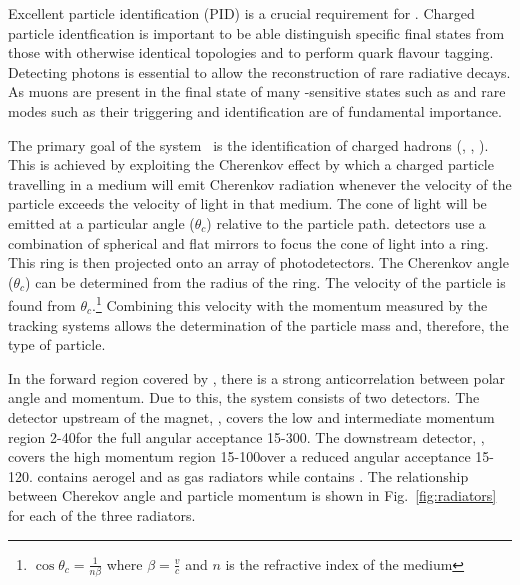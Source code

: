 Excellent particle identification (PID) is a crucial requirement for \lhcb. Charged particle identfication is important to be able distinguish specific final states from those with otherwise identical topologies and to perform \bquark quark flavour tagging. Detecting photons is essential to allow the reconstruction of rare radiative decays. As muons are present in the final state of many \CP-sensitive states such as \BsToJPsiPhi and rare modes such as \BsToMuMu their triggering and identification are of fundamental importance.

The primary goal of the \rich system~\cite{LHCb-TDR-009,LHCb-DP-2012-003} is the identification of charged hadrons (\pion, \kaon, \proton). This is achieved by exploiting the Cherenkov effect by which a charged particle travelling in a medium will emit Cherenkov radiation whenever the velocity of the particle exceeds the velocity of light in that medium. The cone of light will be emitted at a particular angle ($\theta_{c}$) relative to the particle path. \rich detectors use a combination of spherical and flat mirrors to focus the cone of light into a ring. This ring is then projected onto an array of photodetectors. The Cherenkov angle ($\theta_{c}$) can be determined from the radius of the ring. The velocity of the particle is found from $\theta_{c}$.\footnote{$\cos\theta_{c} = \frac{1}{n\beta}$ where $\beta = \frac{v}{c}$ and $n$ is the refractive index of the medium} Combining this velocity with the momentum measured by the tracking systems allows the determination of the particle mass and, therefore, the type of particle. 

In the forward region covered by \lhcb, there is a strong anticorrelation between polar angle and momentum. Due to this, the \rich system consists of two detectors. The detector upstream of the magnet, \richone, covers the low and intermediate momentum region 2-40\gevc for the full angular acceptance 15-300\mrad. The downstream detector, \richtwo, covers the high momentum region 15-100\gevc over a reduced angular acceptance 15-120\mrad. \richone contains aerogel and \cfourften as gas radiators while \richtwo contains \cffour. The relationship between Cherekov angle and particle momentum is shown in Fig.~\ref{fig:radiators} for each of the three radiators.

